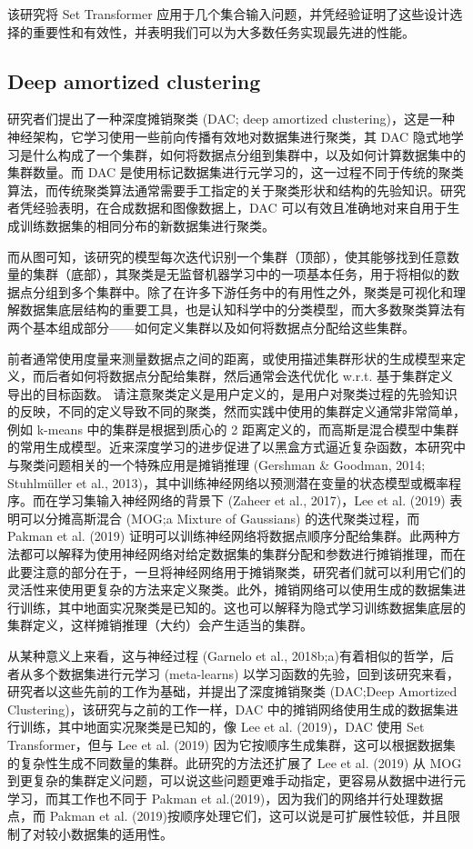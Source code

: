 该研究将 Set Transformer 应用于几个集合输入问题，并凭经验证明了这些设计选择的重要性和有效性，并表明我们可以为大多数任务实现最先进的性能。

\subsection{Deep amortized clustering}

研究者们提出了一种深度摊销聚类 (DAC; deep amortized clustering)，这是一种神经架构，它学习使用一些前向传播有效地对数据集进行聚类，其 DAC 隐式地学习是什么构成了一个集群，如何将数据点分组到集群中，以及如何计算数据集中的集群数量。而 DAC 是使用标记数据集进行元学习的，这一过程不同于传统的聚类算法，而传统聚类算法通常需要手工指定的关于聚类形状和结构的先验知识。研究者凭经验表明，在合成数据和图像数据上，DAC 可以有效且准确地对来自用于生成训练数据集的相同分布的新数据集进行聚类。

而从图可知，该研究的模型每次迭代识别一个集群（顶部），使其能够找到任意数量的集群（底部），其聚类是无监督机器学习中的一项基本任务，用于将相似的数据点分组到多个集群中。除了在许多下游任务中的有用性之外，聚类是可视化和理解数据集底层结构的重要工具，也是认知科学中的分类模型，而大多数聚类算法有两个基本组成部分——如何定义集群以及如何将数据点分配给这些集群。

前者通常使用度量来测量数据点之间的距离，或使用描述集群形状的生成模型来定义，而后者如何将数据点分配给集群，然后通常会迭代优化 w.r.t. 基于集群定义导出的目标函数。
请注意聚类定义是用户定义的，是用户对聚类过程的先验知识的反映，不同的定义导致不同的聚类，然而实践中使用的集群定义通常非常简单，例如 k-means 中的集群是根据到质心的 2 距离定义的，而高斯是混合模型中集群的常用生成模型。近来深度学习的进步促进了以黑盒方式逼近复杂函数，本研究中与聚类问题相关的一个特殊应用是摊销推理 (Gershman \& Goodman, 2014; Stuhlmüller et al., 2013)，其中训练神经网络以预测潜在变量的状态模型或概率程序。而在学习集输入神经网络的背景下 (Zaheer et al., 2017)，Lee et al. (2019)  表明可以分摊高斯混合 (MOG;a Mixture of Gaussians) 的迭代聚类过程，而 Pakman et al. (2019) 证明可以训练神经网络将数据点顺序分配给集群。此两种方法都可以解释为使用神经网络对给定数据集的集群分配和参数进行摊销推理，而在此要注意的部分在于，一旦将神经网络用于摊销聚类，研究者们就可以利用它们的灵活性来使用更复杂的方法来定义聚类。此外，摊销网络可以使用生成的数据集进行训练，其中地面实况聚类是已知的。这也可以解释为隐式学习训练数据集底层的集群定义，这样摊销推理（大约）会产生适当的集群。

从某种意义上来看，这与神经过程 (Garnelo et al., 2018b;a)有着相似的哲学，后者从多个数据集进行元学习 (meta-learns) 以学习函数的先验，回到该研究来看，研究者以这些先前的工作为基础，并提出了深度摊销聚类 (DAC;Deep Amortized Clustering)，该研究与之前的工作一样，DAC 中的摊销网络使用生成的数据集进行训练，其中地面实况聚类是已知的，像 Lee et al. (2019)，DAC 使用 Set Transformer，但与 Lee et al. (2019) 因为它按顺序生成集群，这可以根据数据集的复杂性生成不同数量的集群。此研究的方法还扩展了 Lee et al. (2019) 从 MOG 到更复杂的集群定义问题，可以说这些问题更难手动指定，更容易从数据中进行元学习，而其工作也不同于 Pakman et al.(2019)，因为我们的网络并行处理数据点，而 Pakman et al. (2019)按顺序处理它们，这可以说是可扩展性较低，并且限制了对较小数据集的适用性。

